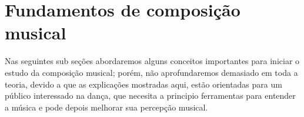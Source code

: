 
\chapter{Fundamentos de composição musical}
\label{cap:musicacomposer}
Nas seguintes sub seções abordaremos alguns conceitos importantes para iniciar o estudo da composição musical;
porém, não aprofundaremos demasiado em toda a teoria, 
devido a que as explicações mostradas aqui, estão
orientadas para um público interessado na dança, que necesita a principio
ferramentas para entender a música e pode depois melhorar sua percepção musical. 


 
 
 


 



 

 

  
% 

  


